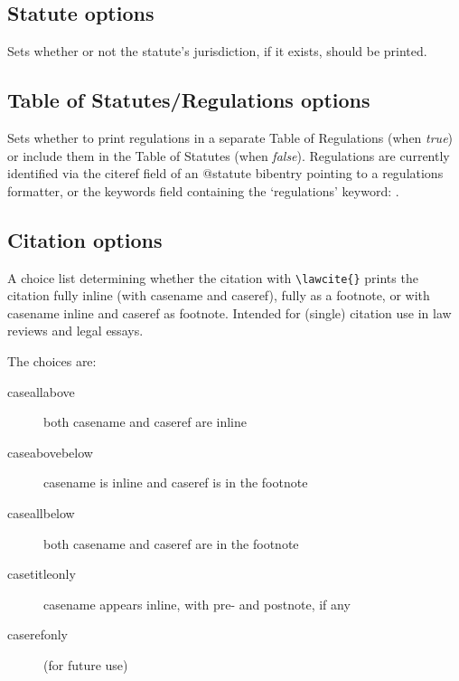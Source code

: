 \subsection{Statute options}


Sets whether or not the statute's jurisdiction, if it exists, should be printed.
\bigskip

\subsection{Table of Statutes/Regulations options}


Sets whether to print regulations in a separate Table of Regulations (when \textit{true}) or include them in the Table of Statutes (when \textit{false}). Regulations are currently identified via the citeref field of an @statute bibentry pointing to a regulations formatter, or the keywords field containing the `regulations' keyword: .
\bigskip




\subsection{Citation options}


A choice list determining whether the citation with \texttt{\textbackslash lawcite\{\}} prints the citation fully inline (with casename and caseref), fully as a footnote, or with casename inline and caseref as footnote. Intended for (single) citation use in law reviews and legal essays.

The choices are:

\begin{description}
\item[caseallabove] both casename and caseref are inline
\item[caseabovebelow] casename is inline and caseref is in the footnote
\item[caseallbelow] both casename and caseref are in the footnote
\item[casetitleonly] casename appears inline, with pre- and postnote, if any%
\item[caserefonly] (for future use)
\end{description}


